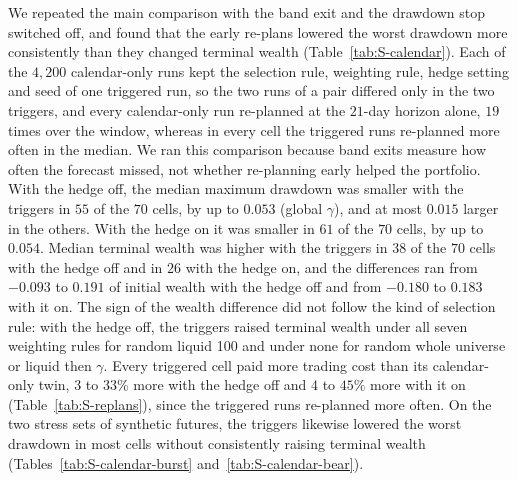 We repeated the main comparison with the band exit and the drawdown stop switched off, and found that the early
re-plans lowered the worst drawdown more consistently than they changed terminal wealth (Table~\ref{tab:S-calendar}).
Each of the $4{,}200$ calendar-only runs kept the selection rule, weighting rule, hedge setting and seed of one
triggered run, so the two runs of a pair differed only in the two triggers, and every calendar-only run re-planned
at the $21$-day horizon alone, $19$ times over the window, whereas in every cell the triggered runs re-planned more
often in the median. We ran this comparison because band exits measure how often the forecast missed, not whether re-planning
early helped the portfolio. With the hedge off, the median maximum drawdown was smaller with the triggers in $55$ of
the $70$ cells, by up to $0.053$ (global $\gamma$), and at most $0.015$ larger in the others. With the
hedge on it was smaller in $61$ of the $70$ cells, by up to $0.054$. Median terminal wealth was higher with the
triggers in $38$ of the $70$ cells with the hedge off and in $26$ with the hedge on, and the differences ran from
$-0.093$ to $0.191$ of initial wealth with the hedge off and from $-0.180$ to $0.183$ with it on. The sign of the
wealth difference did not follow the kind of selection rule: with the hedge off, the triggers raised terminal
wealth under all seven weighting rules for random liquid 100 and under none for random whole universe or liquid then
$\gamma$. Every triggered cell paid more trading cost than its calendar-only twin, $3$ to $33\%$ more with the hedge
off and $4$ to $45\%$ more with it on (Table~\ref{tab:S-replans}), since the triggered runs re-planned more often. On
the two stress sets of synthetic futures, the triggers likewise lowered the worst drawdown in most cells without
consistently raising terminal wealth (Tables~\ref{tab:S-calendar-burst} and~\ref{tab:S-calendar-bear}).


